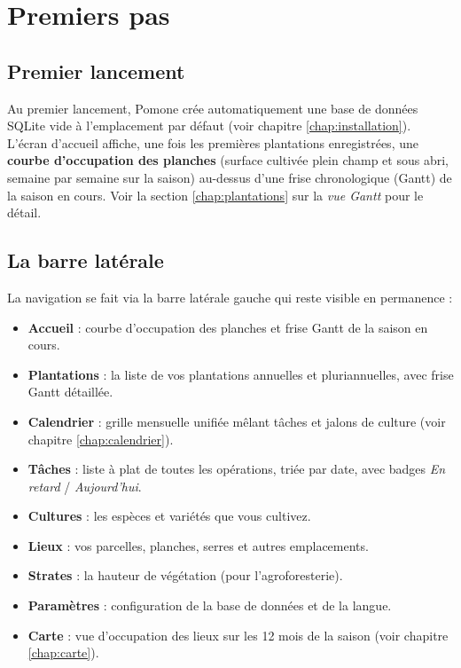 \chapter{Premiers pas}
\label{chap:premiers-pas}

\section{Premier lancement}

Au premier lancement, Pomone crée automatiquement une base de données SQLite vide à l'emplacement par défaut (voir chapitre \ref{chap:installation}). L'écran d'accueil affiche, une fois les premières plantations enregistrées, une \textbf{courbe d'occupation des planches} (surface cultivée plein champ et sous abri, semaine par semaine sur la saison) au-dessus d'une frise chronologique (Gantt) de la saison en cours. Voir la section \ref{chap:plantations} sur la \emph{vue Gantt} pour le détail.

\section{La barre latérale}

La navigation se fait via la barre latérale gauche qui reste visible en permanence :

\begin{itemize}
  \item \textbf{Accueil} : courbe d'occupation des planches et frise Gantt de la saison en cours.
  \item \textbf{Plantations} : la liste de vos plantations annuelles et pluriannuelles, avec frise Gantt détaillée.
  \item \textbf{Calendrier} : grille mensuelle unifiée mêlant tâches et jalons de culture (voir chapitre \ref{chap:calendrier}).
  \item \textbf{Tâches} : liste à plat de toutes les opérations, triée par date, avec badges \emph{En retard} / \emph{Aujourd'hui}.
  \item \textbf{Cultures} : les espèces et variétés que vous cultivez.
  \item \textbf{Lieux} : vos parcelles, planches, serres et autres emplacements.
  \item \textbf{Strates} : la hauteur de végétation (pour l'agroforesterie).
  \item \textbf{Paramètres} : configuration de la base de données et de la langue.
  \item \textbf{Carte} : vue d'occupation des lieux sur les 12 mois de la saison (voir chapitre \ref{chap:carte}).
\end{itemize}

